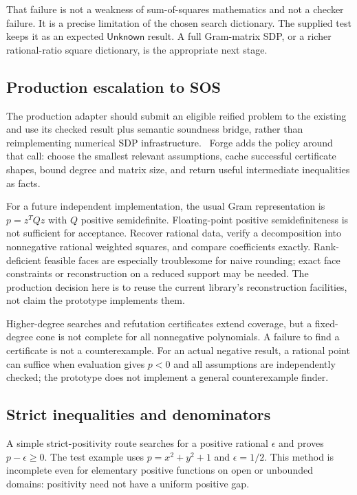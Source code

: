 \documentclass[11pt,letterpaper]{article}
\newcommand{\code}[1]{\texttt{\detokenize{#1}}}
\newcommand{\unknown}{\ensuremath{\mathsf{Unknown}}}
\theoremstyle{definition}\newtheorem{definition}[proposition]{Definition}
\begin{document}
That failure is not a weakness of sum-of-squares mathematics and not a checker failure. It is a precise limitation of the chosen search dictionary. The supplied test keeps it as an expected \unknown{} result. A full Gram-matrix SDP, or a richer rational-ratio square dictionary, is the appropriate next stage.

\subsection{Production escalation to SOS}
The production adapter should submit an eligible reified problem to the existing \code{SOS.Engine} and use its checked result plus semantic soundness bridge, rather than reimplementing numerical SDP infrastructure.~\cite{sos} Forge adds the policy around that call: choose the smallest relevant assumptions, cache successful certificate shapes, bound degree and matrix size, and return useful intermediate inequalities as facts.

For a future independent implementation, the usual Gram representation is $p=z^TQz$ with $Q$ positive semidefinite. Floating-point positive semidefiniteness is not sufficient for acceptance. Recover rational data, verify a decomposition into nonnegative rational weighted squares, and compare coefficients exactly. Rank-deficient feasible faces are especially troublesome for naive rounding; exact face constraints or reconstruction on a reduced support may be needed. The production decision here is to reuse the current library's reconstruction facilities, not claim the prototype implements them.

Higher-degree searches and refutation certificates extend coverage, but a fixed-degree cone is not complete for all nonnegative polynomials. A failure to find a certificate is not a counterexample. For an actual negative result, a rational point can suffice when evaluation gives $p<0$ and all assumptions are independently checked; the prototype does not implement a general counterexample finder.

\subsection{Strict inequalities and denominators}
A simple strict-positivity route searches for a positive rational $\epsilon$ and proves $p-\epsilon\ge0$. The test example uses $p=x^2+y^2+1$ and $\epsilon=1/2$. This method is incomplete even for elementary positive functions on open or unbounded domains: positivity need not have a uniform positive gap.
\end{document}
